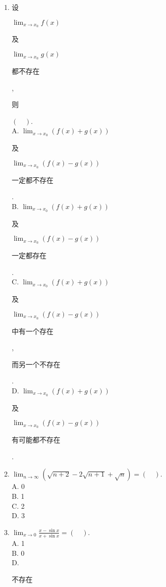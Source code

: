 \documentclass[10pt]{article}
\begin{document}
\begin{enumerate}
  \item \begin{CJK}{UTF8}{mj}设\end{CJK} $\lim _{x \rightarrow x_{0}} f(x)$ \begin{CJK}{UTF8}{mj}及\end{CJK} $\lim _{x \rightarrow x_{0}} g(x)$ \begin{CJK}{UTF8}{mj}都不存在\end{CJK}, \begin{CJK}{UTF8}{mj}则\end{CJK} $(\quad)$.\\
A. $\lim _{x \rightarrow x_{0}}(f(x)+g(x))$ \begin{CJK}{UTF8}{mj}及\end{CJK} $\lim _{x \rightarrow x_{0}}(f(x)-g(x))$ \begin{CJK}{UTF8}{mj}一定都不存在\end{CJK}.\\
B. $\lim _{x \rightarrow x_{0}}(f(x)+g(x))$ \begin{CJK}{UTF8}{mj}及\end{CJK} $\lim _{x \rightarrow x_{0}}(f(x)-g(x))$ \begin{CJK}{UTF8}{mj}一定都存在\end{CJK}.\\
C. $\lim _{x \rightarrow x_{0}}(f(x)+g(x))$ \begin{CJK}{UTF8}{mj}及\end{CJK} $\lim _{x \rightarrow x_{0}}(f(x)-g(x))$ \begin{CJK}{UTF8}{mj}中有一个存在\end{CJK}, \begin{CJK}{UTF8}{mj}而另一个不存在\end{CJK}.\\
D. $\lim _{x \rightarrow x_{0}}(f(x)+g(x))$ \begin{CJK}{UTF8}{mj}及\end{CJK} $\lim _{x \rightarrow x_{0}}(f(x)-g(x))$ \begin{CJK}{UTF8}{mj}有可能都不存在\end{CJK}.

  \item $\lim _{n \rightarrow \infty}(\sqrt{n+2}-2 \sqrt{n+1}+\sqrt{n})=(\quad)$.\\
A. 0\\
B. 1\\
C. 2\\
D. 3

  \item $\lim _{x \rightarrow 0} \frac{x-\sin x}{x+\sin x}=(\quad)$.\\
A. 1\\
B. 0\\
D. \begin{CJK}{UTF8}{mj}不存在\end{CJK}


\end{enumerate}
\end{document}
